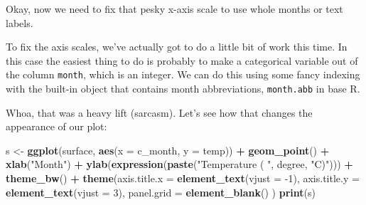 \documentclass[
]{book}
\newenvironment{Shaded}{\begin{snugshade}}{\end{snugshade}}
\newcommand{\DataTypeTok}[1]{\textcolor[rgb]{0.13,0.29,0.53}{#1}}
\newcommand{\DecValTok}[1]{\textcolor[rgb]{0.00,0.00,0.81}{#1}}
\newcommand{\KeywordTok}[1]{\textcolor[rgb]{0.13,0.29,0.53}{\textbf{#1}}}
\newcommand{\NormalTok}[1]{#1}
\newcommand{\OperatorTok}[1]{\textcolor[rgb]{0.81,0.36,0.00}{\textbf{#1}}}
\newcommand{\StringTok}[1]{\textcolor[rgb]{0.31,0.60,0.02}{#1}}
\begin{document}
Okay, now we need to fix that pesky x-axis scale to use whole months or text labels.

To fix the axis scales, we've actually got to do a little bit of work this time. In this case the easiest thing to do is probably to make a categorical variable out of the column \texttt{month}, which is an integer. We can do this using some fancy indexing with the built-in object that contains month abbreviations, \texttt{month.abb} in base R.

\begin{Shaded}
\end{Shaded}

Whoa, that was a heavy lift (sarcasm). Let's see how that changes the appearance of our plot:

\begin{Shaded}
\begin{Highlighting}[]
\NormalTok{s <-}\StringTok{ }\KeywordTok{ggplot}\NormalTok{(surface, }\KeywordTok{aes}\NormalTok{(}\DataTypeTok{x =}\NormalTok{ c_month, }\DataTypeTok{y =}\NormalTok{ temp)) }\OperatorTok{+}
\StringTok{  }\KeywordTok{geom_point}\NormalTok{() }\OperatorTok{+}\StringTok{ }
\StringTok{  }\KeywordTok{xlab}\NormalTok{(}\StringTok{"Month"}\NormalTok{) }\OperatorTok{+}
\StringTok{  }\KeywordTok{ylab}\NormalTok{(}\KeywordTok{expression}\NormalTok{(}\KeywordTok{paste}\NormalTok{(}\StringTok{"Temperature ( "}\NormalTok{, degree, }\StringTok{"C)"}\NormalTok{))) }\OperatorTok{+}
\StringTok{  }\KeywordTok{theme_bw}\NormalTok{() }\OperatorTok{+}
\StringTok{  }\KeywordTok{theme}\NormalTok{(}\DataTypeTok{axis.title.x =} \KeywordTok{element_text}\NormalTok{(}\DataTypeTok{vjust =} \DecValTok{-1}\NormalTok{),}
        \DataTypeTok{axis.title.y =} \KeywordTok{element_text}\NormalTok{(}\DataTypeTok{vjust =} \DecValTok{3}\NormalTok{),}
        \DataTypeTok{panel.grid =} \KeywordTok{element_blank}\NormalTok{()}
\NormalTok{  )}
\KeywordTok{print}\NormalTok{(s)}
\end{Highlighting}
\end{Shaded}
\end{document}
